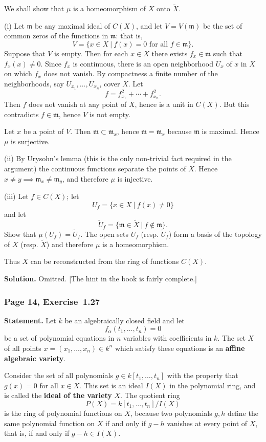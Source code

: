 \documentclass[12pt,letterpaper]{article}%
\newcommand{\mf}{\mathfrak}
\newcommand{\mmm}{\mf m}
\newcommand{\nn}{\noindent}
\begin{document}
We shall show that $\mu$ is a homeomorphism of $X$ onto $\widetilde X$.

\nn(i) Let $\mmm$ be any maximal ideal of $C(X)$, and let $V=V(\mmm)$ be the set of common zeros of the functions in $\mmm$: that is,
$$
V=\{x\in X\ |\ f(x)=0\text{ for all }f\in\mmm\}.
$$
Suppose that $V$ is empty. Then for each $x\in X$ there exists $f_x\in\mmm$ such that $f_x(x) \ne0$. Since $f_x$ is continuous, there is an open neighborhood $U_x$ of $x$ in $X$ on which $f_x$ does not vanish. By compactness a finite number of the neighborhoods, say $U_{x_1},\ldots,U_{x_n}$, cover $X$. Let
$$
f=f_{x_1}^2+\cdots+f_{x_n}^2.
$$
Then $f$ does not vanish at any point of $X$, hence is a unit in $C(X)$. But this contradicts $f\in\mmm$, hence $V$ is not empty.

Let $x$ be a point of $V$. Then $\mmm\subset\mmm_x$, hence $\mmm=\mmm_x$ because $\mmm$ is maximal. Hence $\mu$ is surjective.

\nn(ii) By Urysohn's lemma (this is the only non-trivial fact required in the argument) the continuous functions separate the points of $X$. Hence $x\ne y\implies\mmm_x\ne\mmm_y$, and therefore $\mu$ is injective.

\nn(iii) Let $f\in C(X)$; let
$$
U_f=\{x\in X\ |\ f(x)\ne0\}
$$ 
and let 
$$
\widetilde U_f=\{\mmm\in\widetilde X\ |\ f\notin\mmm\}.
$$
Show that $\mu(U_f)=\widetilde U_f$. The open sets $U_f$ (resp. $\widetilde U_f$) form a basis of the topology of $X$ (resp. $\widetilde X$) and therefore $\mu$ is a homeomorphism.

Thus $X$ can be reconstructed from the ring of functions $C(X)$.

\nn\textbf{Solution.} Omitted. [The hint in the book is fairly complete.]

\subsubsection{Page 14, Exercise~1.27}\label{ex1.27}%

\textbf{Statement.} Let $k$ be an algebraically closed field and let 
$$
f_\alpha(t_1,\ldots,t_n)=0
$$
be a set of polynomial equations in $n$ variables with coefficients in $k$. The set $X$ of all points $x=(x_1,\ldots,x_n)\in k^n$ which satisfy these equations is an \textbf{affine algebraic variety}.

Consider the set of all polynomials $g\in k[t_1,\ldots,t_n]$ with the property that $g(x)=0$ for all $x\in X$. This set is an ideal $I(X)$ in the polynomial ring, and is called the \textbf{ideal of the variety} $X$. The quotient ring
$$
P(X)=k[t_1,\ldots,t_n]/I(X)
$$ 
is the ring of polynomial functions on $X$, because two polynomials $g,h$ define the same polynomial function on $X$ if and only if $g-h$ vanishes at every point of $X$, that is, if and only if $g-h\in I(X)$.
\end{document}
